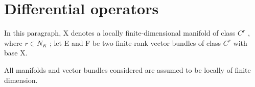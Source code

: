 \section{Differential operators}

In this paragraph, X denotes a locally finite-dimensional manifold of class \(C^{r}\) , where \(r \in N_{K}\) ; let E and F be two finite-rank vector bundles of class \(C^{r}\) with base X.

All manifolds and vector bundles considered are assumed to be locally of finite dimension.

